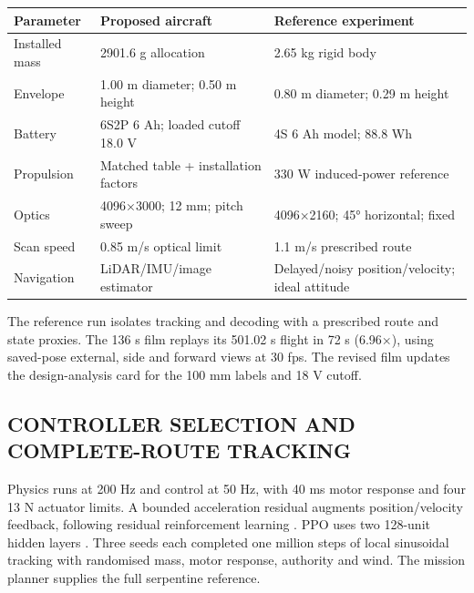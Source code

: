 \documentclass[a4paper,11pt]{article}
\begin{document}
\par\addvspace{8pt}\noindent\begin{minipage}{\linewidth}\centering
{}\label{tab:9}
\begin{tabular}{C{0.290\dimexpr\linewidth-24pt\relax}C{0.290\dimexpr\linewidth-24pt\relax}C{0.420\dimexpr\linewidth-24pt\relax}}
\toprule
\textbf{Parameter} & \textbf{Proposed aircraft} & \textbf{Reference experiment}\\\midrule
Installed mass & 2901.6 g allocation & 2.65 kg rigid body\\
Envelope & 1.00 m diameter; 0.50 m height & 0.80 m diameter; 0.29 m height\\
Battery & 6S2P 6 Ah; loaded cutoff 18.0 V & 4S 6 Ah model; 88.8 Wh\\
Propulsion & Matched table + installation factors & 330 W induced-power reference\\
Optics & 4096×3000; 12 mm; pitch sweep & 4096×2160; 45° horizontal; fixed\\
Scan speed & 0.85 m/s optical limit & 1.1 m/s prescribed route\\
Navigation & LiDAR/IMU/image estimator & Delayed/noisy position/velocity; ideal attitude\\
\bottomrule\end{tabular}\end{minipage}\par\addvspace{8pt}
The reference run isolates tracking and decoding with a prescribed route and state proxies. The 136 s film replays its 501.02 s flight in 72 s (6.96×), using saved-pose external, side and forward views at 30 fps. The revised film updates the design-analysis card for the 100 mm labels and 18 V cutoff.

\subsection{C{\fontsize{9.2}{14}\selectfont ONTROLLER} {\fontsize{9.2}{14}\selectfont SELECTION} {\fontsize{9.2}{14}\selectfont AND} {\fontsize{9.2}{14}\selectfont COMPLETE}-{\fontsize{9.2}{14}\selectfont ROUTE} {\fontsize{9.2}{14}\selectfont TRACKING}}
Physics runs at 200 Hz and control at 50 Hz, with 40 ms motor response and four 13 N actuator limits. A bounded acceleration residual augments position/velocity feedback, following residual reinforcement learning \cite{r28}. PPO uses two 128-unit hidden layers \cite{r29}. Three seeds each completed one million steps of local sinusoidal tracking with randomised mass, motor response, authority and wind. The mission planner supplies the full serpentine reference.
\end{document}
